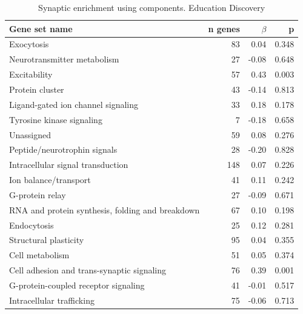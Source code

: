 \begin{table}[ht]
\centering
\begin{tabular}{lrrr}
   \toprule
Gene set name & n genes & $\beta$ & p\\
  \midrule
Exocytosis & 83 & 0.04 & 0.348 \\ 
  Neurotransmitter metabolism & 27 & -0.08 & 0.648 \\ 
  Excitability & 57 & 0.43 & 0.003 \\ 
  Protein cluster & 43 & -0.14 & 0.813 \\ 
  Ligand-gated ion channel signaling & 33 & 0.18 & 0.178 \\ 
  Tyrosine kinase signaling & 7 & -0.18 & 0.658 \\ 
  Unassigned & 59 & 0.08 & 0.276 \\ 
  Peptide/neurotrophin signals & 28 & -0.20 & 0.828 \\ 
  Intracellular signal transduction & 148 & 0.07 & 0.226 \\ 
  Ion balance/transport & 41 & 0.11 & 0.242 \\ 
  G-protein relay & 27 & -0.09 & 0.671 \\ 
  RNA and protein synthesis, folding and breakdown & 67 & 0.10 & 0.198 \\ 
  Endocytosis & 25 & 0.12 & 0.281 \\ 
  Structural plasticity & 95 & 0.04 & 0.355 \\ 
  Cell metabolism & 51 & 0.05 & 0.374 \\ 
  Cell adhesion and trans-synaptic signaling & 76 & 0.39 & 0.001 \\ 
  G-protein-coupled receptor signaling & 41 & -0.01 & 0.517 \\ 
  Intracellular trafficking & 75 & -0.06 & 0.713 \\ 
   \hline
   \bottomrule
\end{tabular}
\caption{Synaptic enrichment using components. Education Discovery } 
\label{tab:MAGMA enrichment of synaptic groups UKBBEd}
\end{table}

